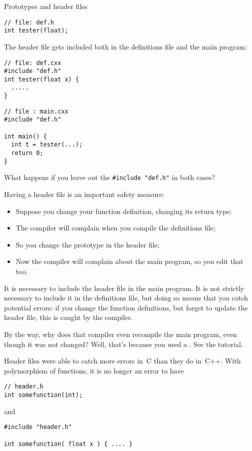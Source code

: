 \begin{block}{Prototypes and header files}
  \label{sl:proto-header}
\begin{lstlisting}
// file: def.h
int tester(float);
\end{lstlisting}
The header file gets included both in the definitions file and the
main program:
\begin{multicols}{2}  
\begin{lstlisting}
// file: def.cxx
#include "def.h"
int tester(float x) {
  .....
}
\end{lstlisting}
\vfill\columnbreak
\begin{lstlisting}
// file : main.cxx
#include "def.h"

int main() {
  int t = tester(...);
  return 0;
}
\end{lstlisting}
\end{multicols}
What happens if you leave out the \lstinline$#include "def.h"$ in both cases?
\end{block}

Having a header file is an important safety measure:
\begin{itemize}
\item Suppose you change your function definition, changing its return
  type:
\item The compiler will complain when you compile the definitions
  file;
\item So you change the prototype in the header file;
\item Now the compiler will complain about the main program, so you
  edit that too.
\end{itemize}

It is necessary to include the header file in the main program. It is
not strictly necessary to include it in the definitions file, but
doing so means that you catch potential errors: if you change the
function definitions, but forget to update the header file, this is
caught by the compiler.

\begin{remark}
  By the way, why does that compiler even recompile the main program,
  even though it was not changed? Well, that's because you used a
  . See the tutorial.
\end{remark}
\begin{remark}
  Header files were able to catch more errors in~C than they do
  in~C++. With polymorphism of functions, it is no longer an error to
  have 
\begin{lstlisting}
// header.h
int somefunction(int);
\end{lstlisting}
and
\begin{lstlisting}
#include "header.h"

int somefunction( float x ) { .... }
\end{lstlisting}
\end{remark}

